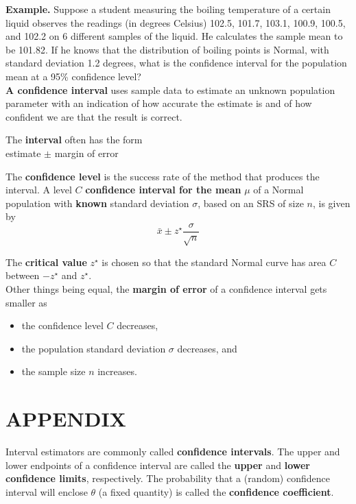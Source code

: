 \textbf{Example.} Suppose a student measuring the boiling temperature of a certain liquid observes the readings (in degrees Celsius) 102.5, 101.7, 103.1, 100.9, 100.5, and 102.2 on 6 different samples of the liquid. He calculates the sample mean to be 101.82. If he knows that the distribution of boiling points is Normal, with standard deviation 1.2 degrees, what is the confidence interval for the population mean at a 95\% confidence level?\\
\textbf{A confidence interval} uses sample data to estimate an unknown population parameter with an indication of how accurate the estimate is and of how confident we are that the result is correct.

\vspace{1em}

The \textbf{interval} often has the form\\
\hspace*{2em}estimate $\pm$ margin of error

\vspace{1em}

The \textbf{confidence level} is the success rate of the method that produces the interval.
 A level $C$ \textbf{confidence interval for the mean} $\mu$ of a Normal population with \textbf{known} standard deviation $\sigma$, based on an SRS of size $n$, is given by
\[
\bar{x} \pm z^\star \frac{\sigma}{\sqrt{n}}
\]

The \textbf{critical value} $z^\star$ is chosen so that the standard Normal curve has area $C$ between $-z^\star$ and $z^\star$. \\

Other things being equal, the \textbf{margin of error} of a confidence interval gets smaller as
\begin{itemize}
    \item the confidence level $C$ decreases,
    \item the population standard deviation $\sigma$ decreases, and
    \item the sample size $n$ increases.
\end{itemize}
\vspace{\baselineskip} 
\section{APPENDIX}


Interval estimators are commonly called \textbf{confidence intervals}. The upper and lower endpoints of a confidence interval are called the \textbf{upper} and \textbf{lower confidence limits}, respectively. The probability that a (random) confidence interval will enclose $\theta$ (a fixed quantity) is called the \textbf{confidence coefficient}.\\


